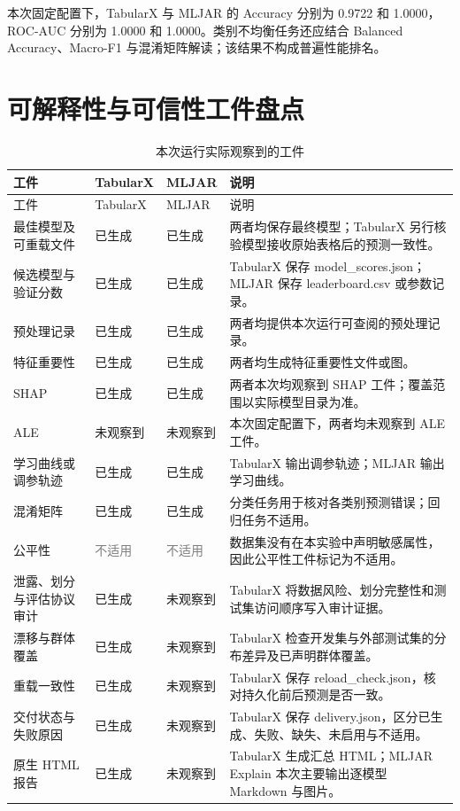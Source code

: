 \documentclass[degree=bachelor,language=chinese,fontset=fandol]{thuthesis}
\newcommand{\yes}{\textcolor{green!50!black}{已生成}}
\newcommand{\no}{\textcolor{red!70!black}{未观察到}}
\newcommand{\na}{\textcolor{gray}{不适用}}
\begin{document}
本次固定配置下，TabularX 与 MLJAR 的 Accuracy 分别为 0.9722 和 1.0000，ROC-AUC 分别为 1.0000 和 1.0000。类别不均衡任务还应结合 Balanced Accuracy、Macro-F1 与混淆矩阵解读；该结果不构成普遍性能排名。

\section{可解释性与可信性工件盘点}
\begin{longtable}{>{\raggedright\arraybackslash}p{}>{\centering\arraybackslash}p{}>{\centering\arraybackslash}p{}>{\raggedright\arraybackslash}p{}}
  \caption{本次运行实际观察到的工件}\label{tab:artifacts}\\
  \toprule
  工件 & TabularX & MLJAR & 说明 \\
  \midrule
  \endfirsthead
  \toprule
  工件 & TabularX & MLJAR & 说明 \\
  \midrule
  \endhead
  最佳模型及可重载文件 & \yes & \yes & 两者均保存最终模型；TabularX 另行核验模型接收原始表格后的预测一致性。 \\
  候选模型与验证分数 & \yes & \yes & TabularX 保存 model\_scores.json；MLJAR 保存 leaderboard.csv 或参数记录。 \\
  预处理记录 & \yes & \yes & 两者均提供本次运行可查阅的预处理记录。 \\
  特征重要性 & \yes & \yes & 两者均生成特征重要性文件或图。 \\
  SHAP & \yes & \yes & 两者本次均观察到 SHAP 工件；覆盖范围以实际模型目录为准。 \\
  ALE & \no & \no & 本次固定配置下，两者均未观察到 ALE 工件。 \\
  学习曲线或调参轨迹 & \yes & \yes & TabularX 输出调参轨迹；MLJAR 输出学习曲线。 \\
  混淆矩阵 & \yes & \yes & 分类任务用于核对各类别预测错误；回归任务不适用。 \\
  公平性 & \na & \na & 数据集没有在本实验中声明敏感属性，因此公平性工件标记为不适用。 \\
  泄露、划分与评估协议审计 & \yes & \no & TabularX 将数据风险、划分完整性和测试集访问顺序写入审计证据。 \\
  漂移与群体覆盖 & \yes & \no & TabularX 检查开发集与外部测试集的分布差异及已声明群体覆盖。 \\
  重载一致性 & \yes & \no & TabularX 保存 reload\_check.json，核对持久化前后预测是否一致。 \\
  交付状态与失败原因 & \yes & \no & TabularX 保存 delivery.json，区分已生成、失败、缺失、未启用与不适用。 \\
  原生 HTML 报告 & \yes & \no & TabularX 生成汇总 HTML；MLJAR Explain 本次主要输出逐模型 Markdown 与图片。 \\
  \bottomrule
\end{longtable}
\end{document}
